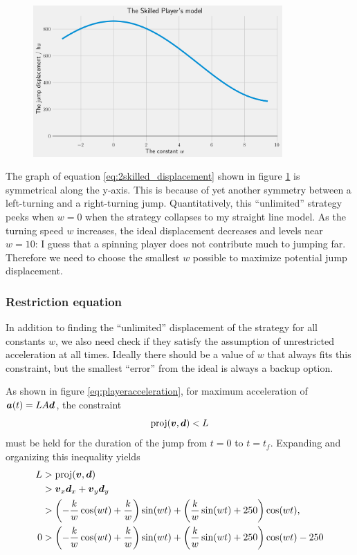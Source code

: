 \begin{figure}[H]
    \centering
    \includegraphics[width=0.85\textwidth]{assets/skilled_displacement.png}
    \caption{}
    \label{fig:skilled_displacement}

\end{figure}
The graph of equation \ref{eq:2skilled_displacement} shown in figure \ref{fig:skilled_displacement} is symmetrical along the y-axis. This is because of yet another symmetry between a left-turning and a right-turning jump. Quantitatively, this ``unlimited'' strategy peeks when $w=0$ when the strategy collapses to my straight line model. As the turning speed $w$ increases, the ideal displacement decreases and levels near $w=10$: I guess that a spinning player does not contribute much to jumping far. Therefore we need to choose the smallest $w$ possible to maximize potential jump displacement.

\subsubsection{Restriction equation}
In addition to finding the ``unlimited'' displacement of the strategy for all constants $w$, we also need check if they satisfy the assumption of unrestricted acceleration at all times. Ideally there should be a value of $w$ that always fits this constraint, but the smallest ``error'' from the ideal is always a backup option.

As shown in figure \ref{eq:playeracceleration}, for maximum acceleration of $\boldsymbol{a}(t) = LA\boldsymbol{d}$, the constraint
\[
    \text{proj}(\boldsymbol{v}, \boldsymbol{d}) < L
\]
must be held for the duration of the jump from $t=0$ to $t=t_f$. Expanding and organizing this inequality yields
\begin{align*}
    L &> \text{proj}(\boldsymbol{v}, \boldsymbol{d})\\
    &> \boldsymbol{v}_x \boldsymbol{d}_x + \boldsymbol{v}_y \boldsymbol{d}_y\\
    &> \left(-\frac{k}{w} \cos(wt) + \frac{k}{w}\right) \sin(wt) + \left(\frac{k}{w} \sin(wt) + 250\right) \cos(wt),\\
    0 &> \left(-\frac{k}{w} \cos(wt) + \frac{k}{w}\right) \sin(wt) + \left(\frac{k}{w} \sin(wt) + 250\right) \cos(wt) - 250
\end{align*}


